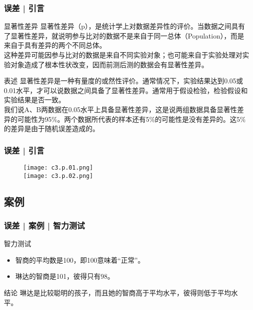 \begin{frame}
  \frametitle{误差 | 引言}
  \begin{block}{显著性差异}
显著性差异（p），是统计学上对数据差异性的评价。当数据之间具有了显著性差异，就说明参与比对的数据不是来自于同一总体（Population），而是来自于具有差异的两个不同总体。\\
\vspace{0.3em}
  这种差异可能因参与比对的数据是来自不同实验对象；也可能来自于实验处理对实验对象造成了根本性状改变，因而前测后测的数据会有显著性差异。
  \end{block}
  \pause
  \begin{block}{表述}
    显著性差异是一种有量度的或然性评价。通常情况下，实验结果达到0.05或0.01水平，才可以说数据之间具备了显著性差异。通常用于假设检验，检验假设和实验结果是否一致。\\
    \vspace{0.3em}
我们说A、B两数据在0.05水平上具备显著性差异，这是说两组数据具备显著性差异的可能性为95\%。两个数据所代表的样本还有5\%的可能性是没有差异的。这5\%的差异是由于随机误差造成的。\\
  \end{block}
\end{frame}

\begin{frame}
  \frametitle{误差 | 引言}
  \begin{figure}
    \centering
    \texttt{[image: c3.p.01.png]}\\
    \texttt{[image: c3.p.02.png]}
  \end{figure}
\end{frame}

\subsection{案例}
\begin{frame}
  \frametitle{误差 | 案例 | 智力测试}
  \begin{block}{智力测试}
    \begin{itemize}
      \item 智商的平均数是100，即100意味着“正常”。
      \item 琳达的智商是101，彼得只有98。
    \end{itemize}
  \end{block}
  \pause
  \begin{block}{结论}
    琳达是比较聪明的孩子，而且她的智商高于平均水平，彼得则低于平均水平。
  \end{block}
\end{frame}

